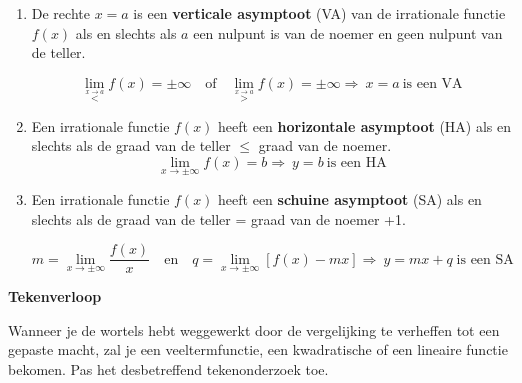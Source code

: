 \begin{enumerate}
	\item De rechte $x=a$ is een \textbf{verticale asymptoot} (VA) van de
irrationale functie $f(x)$ als en slechts als $a$ een nulpunt is
van de noemer en geen nulpunt van de teller.

\begin{equation*}
\lim_{\overset{x\rightarrow a}{<}}f(x)=\pm\infty\quad\textrm{of}\quad \lim_{\overset{x\rightarrow a}{>}}f(x)=\pm\infty \Rightarrow\:x=a\:\textrm{is een VA}
\end{equation*}

\item Een irrationale functie $f(x)$ heeft een \textbf{horizontale asymptoot}
(HA) als en slechts als de graad van de teller $\le$ graad
van de noemer.
\begin{equation*}
\lim_{x\to\pm\infty}f(x)=b \Rightarrow\:y=b\:\textrm{is een HA}
\end{equation*}

\item Een irrationale functie $f(x)$ heeft een \textbf{schuine asymptoot}
(SA) als en slechts als de graad van de teller = graad van de noemer
+1.

\begin{equation*}
m=\lim_{x\to\pm\infty}\frac{f(x)}{x}\quad\textrm{en}\quad 
q= \lim_{x\to\pm\infty}\left[f(x)-mx\right]
\Rightarrow\:y=mx+q\;\textrm{is een SA}
\end{equation*}

\end{enumerate}


\textbf{Tekenverloop}

Wanneer je de wortels hebt weggewerkt door de vergelijking te verheffen
tot een gepaste macht, zal je een veeltermfunctie, een kwadratische
of een lineaire functie bekomen. Pas het desbetreffend tekenonderzoek
toe.


